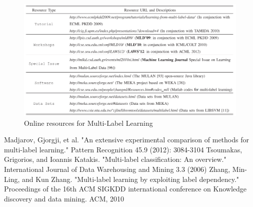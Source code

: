 \documentclass[12pt]{report}
\begin{document}
	\begin{figure}[H]
		\centering
		\includegraphics[width=1\textwidth]{online.png}
		\caption{Online resources for Multi-Label Learning}
		\centering
	\end{figure}
	
	\renewcommand\bibname{Related Work}
	\begin{thebibliography}{9}
		Madjarov, Gjorgji, et al. "An extensive experimental comparison of methods for multi-label learning." Pattern Recognition 45.9 (2012): 3084-3104
		 Tsoumakas, Grigorios, and Ioannis Katakis. "Multi-label classification: An overview." International Journal of Data Warehousing and Mining 3.3 (2006)
		 Zhang, Min-Ling, and Kun Zhang. "Multi-label learning by exploiting label dependency." Proceedings of the 16th ACM SIGKDD international conference on Knowledge discovery and data mining. ACM, 2010
	\end{thebibliography}
\end{document}
